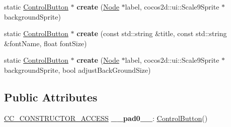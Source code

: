 \begin{DoxyCompactItemize}
static \hyperlink{classControlButton}{Control\+Button} $\ast$ {\bfseries create} (\hyperlink{classNode}{Node} $\ast$label, cocos2d\+::ui\+::\+Scale9\+Sprite $\ast$background\+Sprite)
\item 
\mbox{\label{classControlButton_aaff0521fe96789df98af258fc8936e01}} 
static \hyperlink{classControlButton}{Control\+Button} $\ast$ {\bfseries create} (const std\+::string \&title, const std\+::string \&font\+Name, float font\+Size)
\item 
\mbox{\label{classControlButton_adeb9c19fb5cdd7ce1036e3d6abf26f33}} 
static \hyperlink{classControlButton}{Control\+Button} $\ast$ {\bfseries create} (\hyperlink{classNode}{Node} $\ast$label, cocos2d\+::ui\+::\+Scale9\+Sprite $\ast$background\+Sprite, bool adjust\+Back\+Ground\+Size)
\end{DoxyCompactItemize}
\subsection*{Public Attributes}
\begin{DoxyCompactItemize}
\item 
\mbox{\label{classControlButton_a7e8742226f5f582f202d414576935433}} 
\hyperlink{_2cocos2d_2cocos_2base_2ccConfig_8h_a25ef1314f97c35a2ed3d029b0ead6da0}{C\+C\+\_\+\+C\+O\+N\+S\+T\+R\+U\+C\+T\+O\+R\+\_\+\+A\+C\+C\+E\+SS} {\bfseries \+\_\+\+\_\+pad0\+\_\+\+\_\+}\+: \hyperlink{classControlButton}{Control\+Button}()
\end{DoxyCompactItemize}
